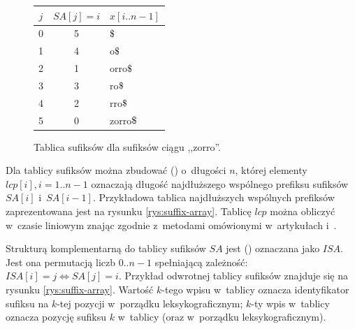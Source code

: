 \begin{figure}[t]
    \begin{center}
        \begin{tabular}{ c c l }
            \toprule
            $j$ & $\textit{SA}[j]=i$ & $x[i..n-1]$ \\
            \midrule
            0 & 5 &        $\dollar$ \\
            1 & 4 &        o$\dollar$ \\
            2 & 1 &        orro$\dollar$ \\
            3 & 3 &        ro$\dollar$ \\
            4 & 2 &        rro$\dollar$ \\
            5 & 0 &        zorro$\dollar$ \\
            \bottomrule
        \end{tabular}
    \end{center}
\caption{Tablica sufiksów dla sufiksów ciągu ,,zorro\dollar''.}%
\label{rys:suffix-array-vis}
\end{figure}

Dla tablicy sufiksów można zbudować 
() \cite{taxonomy} o~długości $n$, której elementy
$\textit{lcp}[i], i = 1..n-1$ oznaczają długość najdłuższego wspólnego prefiksu sufiksów
$\textit{SA}[i]$ i~$\mathit{SA}[i-1]$. Przykładowa tablica najdłuższych wspólnych prefiksów
zaprezentowana jest na rysunku \ref{rys:suffix-array}. Tablicę $\textit{lcp}$ można obliczyć
w~czasie liniowym znając \SA{} zgodnie z~metodami omówionymi w~artykułach \cite{lcp-kasai}
i~\cite{lcp-manzini}.

Strukturą komplementarną do tablicy sufiksów $\textit{SA}$ jest  () \cite{taxonomy} oznaczana jako $\textit{ISA}$. Jest ona
permutacją liczb $0..n-1$ spełniającą zależność: $\textit{ISA}[i] = j \iff \textit{SA}[j] = i$.
Przykład odwrotnej tablicy sufiksów znajduje się na rysunku \ref{rys:suffix-array}. Wartość $k$-tego
wpisu w~tablicy \SA{} oznacza identyfikator sufiksu na $k$-tej pozycji w~porządku leksykograficznym;
$k$-ty wpis w~tablicy \ISA{} oznacza pozycję sufiksu $k$ w~tablicy \SA{} (oraz w~porządku
leksykograficznym).    

